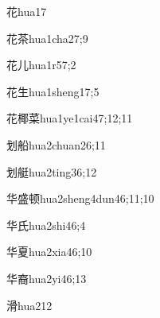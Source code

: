 \begin{verbete}{花}{hua1}{7}
\end{verbete}

\begin{verbete}{花茶}{hua1cha2}{7;9}
\end{verbete}

\begin{verbete}{花儿}{hua1r5}{7;2}
\end{verbete}

\begin{verbete}{花生}{hua1sheng1}{7;5}
\end{verbete}

\begin{verbete}{花椰菜}{hua1ye1cai4}{7;12;11}
\end{verbete}

\begin{verbete}{划船}{hua2chuan2}{6;11}
\end{verbete}

\begin{verbete}{划艇}{hua2ting3}{6;12}
\end{verbete}

\begin{verbete}{华盛顿}{hua2sheng4dun4}{6;11;10}
\end{verbete}

\begin{verbete}{华氏}{hua2shi4}{6;4}
\end{verbete}

\begin{verbete}{华夏}{hua2xia4}{6;10}
\end{verbete}

\begin{verbete}{华裔}{hua2yi4}{6;13}
\end{verbete}

\begin{verbete}{滑}{hua2}{12}
\end{verbete}


